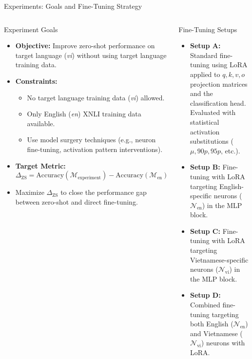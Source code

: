 \documentclass[aspectratio=169]{beamer}
\begin{document}
\begin{frame}{Experiments: Goals and Fine-Tuning Strategy}
	\begin{columns}
		\begin{block}{\scriptsize Experiment Goals}\scriptsize
			\begin{itemize}
				\item \textbf{Objective:} Improve zero-shot performance on target language (\textit{vi}) without using target language training data.
				\item \textbf{Constraints:}
				\begin{itemize}\scriptsize
					\item No target language training data (\textit{vi}) allowed.
					\item Only English (\textit{en}) XNLI training data available.
					\item Use model surgery techniques (e.g., neuron fine-tuning, activation pattern interventions).
				\end{itemize}
				\item \textbf{Target Metric:}
				\begin{equation}
					\Delta_\text{ZS} = \text{Accuracy}(\mathcal{M}_\text{experiment}) - \text{Accuracy}(\mathcal{M}_\text{en})
				\end{equation}
				\item Maximize \(\Delta_\text{ZS}\) to close the performance gap between zero-shot and direct fine-tuning.
				
			\end{itemize}		  
		\end{block}
		\begin{block}{\scriptsize Fine-Tuning Setups}\scriptsize
			\begin{itemize}
				\item \textbf{Setup A:} Standard fine-tuning using LoRA applied to \(q, k, v, o\) projection matrices and the classification head. Evaluated with statistical activation substitutions (\(\mu, 90p, 95p\), etc.).
				\item \textbf{Setup B:} Fine-tuning with LoRA targeting English-specific neurons (\(\mathcal{N}_\text{en}\)) in the MLP block.
				\item \textbf{Setup C:} Fine-tuning with LoRA targeting Vietnamese-specific neurons (\(\mathcal{N}_\text{vi}\)) in the MLP block.
				\item \textbf{Setup D:} Combined fine-tuning targeting both English (\(\mathcal{N}_\text{en}\)) and Vietnamese (\(\mathcal{N}_\text{vi}\)) neurons with LoRA.
				
			\end{itemize}
		\end{block}
	\end{columns}
\end{frame}
\end{document}
